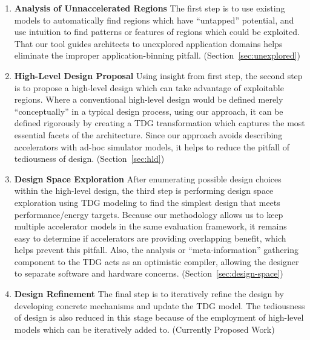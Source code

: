 \begin{enumerate}

\item \textbf{Analysis of Unnaccelerated Regions}  The first step is to use
existing models to automatically find regions which have ``untapped''
potential, and use intuition to find patterns or features of regions which
could be exploited.  That our tool guides architects to unexplored application
domains helps eliminate the improper application-binning pitfall.
(Section~\ref{sec:unexplored})

\item \textbf{High-Level Design Proposal} Using insight from first step, the
second step is to propose a high-level design which can take advantage of
exploitable regions.  Where a conventional high-level design would be defined
merely ``conceptually'' in a typical design process, using our approach, it can
be defined rigorously by creating a TDG transformation which captures the most
essential facets of the architecture.  Since our approach avoids describing
accelerators with ad-hoc simulator models, it helps to reduce the 
pitfall of tediousness of design.  (Section~\ref{sec:hld})

\item \textbf{Design Space Exploration} After enumerating possible design
choices within the high-level design, the third step is performing design space
exploration using TDG modeling to find the simplest design that meets
performance/energy targets.  Because our methodology allows us to keep multiple
accelerator models in the same evaluation framework, it remains easy to
determine if accelerators are providing overlapping benefit, which helps
prevent this pitfall. Also, the analysis or ``meta-information'' gathering
component to the TDG acts as an optimistic compiler, allowing the designer
to separate software and hardware concerns. (Section~\ref{sec:design-space})

\item \textbf{Design Refinement} The final step is to
iteratively refine the design by developing
concrete mechanisms and update the TDG model.  The tediousness of design
is also reduced in this stage because of the employment of high-level models
which can be iteratively added to.
(Currently Proposed Work)

\end{enumerate}


